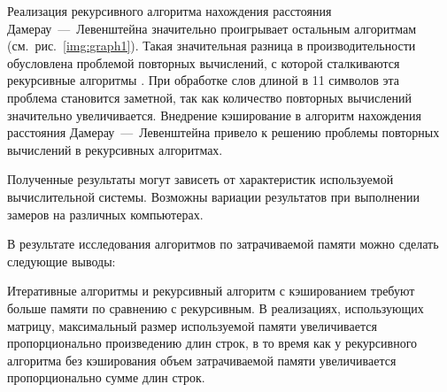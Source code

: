 Реализация рекурсивного алгоритма нахождения расстояния Дамерау~---~Левенштейна значительно проигрывает остальным алгоритмам (см.~рис.~\ref{img:graph1}).
Такая значительная разница в производительности обусловлена проблемой повторных вычислений, с которой сталкиваются рекурсивные алгоритмы \cite{recs}. 
При обработке слов длиной в 11 символов эта проблема становится заметной, так как количество повторных вычислений значительно увеличивается.
Внедрение кэширование в алгоритм нахождения расстояния Дамерау~---~Левенштейна привело к решению проблемы повторных вычислений в рекурсивных алгоритмах.

Полученные результаты могут зависеть от характеристик используемой вычислительной системы. Возможны вариации результатов при выполнении замеров на различных компьютерах.

В результате исследования алгоритмов по затрачиваемой памяти
можно сделать следующие выводы:

Итеративные алгоритмы и рекурсивный алгоритм с кэшированием требуют больше памяти по сравнению с рекурсивным. 
В реализациях, использующих матрицу, максимальный размер используемой памяти увеличивается пропорционально произведению длин строк, в то время как у рекурсивного алгоритма без кэширования объем затрачиваемой памяти увеличивается пропорционально сумме длин строк.